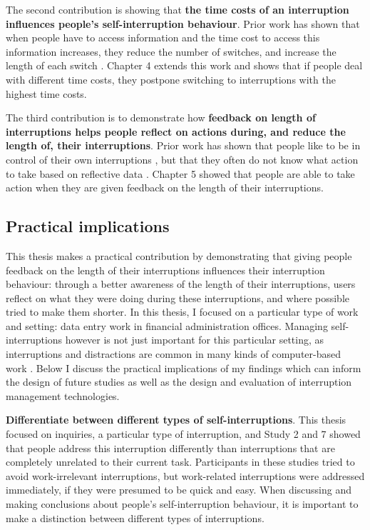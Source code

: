 The second contribution is showing that \textbf{the time costs of an interruption influences people’s self-interruption behaviour}. Prior work has shown that when people have to access information and the time cost to access this information increases, they reduce the number of switches, and increase the length of each switch \citep{Gray2006}. Chapter 4 extends this work and shows that if people deal with different time costs, they postpone switching to interruptions with the highest time costs. 

The third contribution is to demonstrate how \textbf{feedback on length of interruptions helps people reflect on actions during, and reduce the length of, their interruptions}. Prior work has shown that people like to be in control of their own interruptions \citep{Mark2018}, but that they often do not know what action to take based on reflective data \citep{Collins2015, Whittaker2016}. Chapter 5 showed that people are able to take action when they are given feedback on the length of their interruptions.

\subsection{Practical implications}
This thesis makes a practical contribution by demonstrating that giving people feedback on the length of their interruptions influences their interruption behaviour: through a better awareness of the length of their interruptions, users reflect on what they were doing during these interruptions, and where possible tried to make them shorter. In this thesis, I focused on a particular type of work and setting: data entry work in financial administration offices. Managing self-interruptions however is not just important for this particular setting, as interruptions and distractions are common in many kinds of computer-based work \citep{Gonzalez2004}. Below I discuss the practical implications of my findings which can inform the design of future studies as well as the design and evaluation of interruption management technologies. 

\textbf{Differentiate between different types of self-interruptions}. This thesis focused on inquiries, a particular type of interruption, and Study 2 and 7 showed that people address this interruption differently than interruptions that are completely unrelated to their current task. Participants in these studies tried to avoid work-irrelevant interruptions, but work-related interruptions were addressed immediately, if they were presumed to be quick and easy. When discussing and making conclusions about people's self-interruption behaviour, it is important to make a distinction between different types of interruptions.

